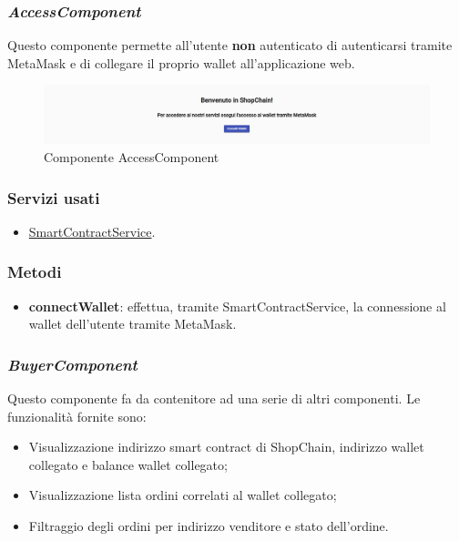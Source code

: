 \subsubsection*{\textit{AccessComponent}}
\label{sec:access-component}
Questo componente permette all'utente \textbf{non} autenticato di autenticarsi tramite MetaMask e di collegare il proprio wallet all'applicazione web.

\begin{figure}[!h] 
    \centering 
    \includegraphics[width=1\columnwidth]{immagini/componenti/access.png} 
    \caption{Componente AccessComponent}
\end{figure}

\subsubsection{Servizi usati}
\begin{itemize}
    \item \hyperref[sec:smart-contract-service]{SmartContractService}.
\end{itemize}

\subsubsection{Metodi}
\begin{itemize}
    \item \textbf{connectWallet}: effettua, tramite SmartContractService, la connessione al wallet dell'utente tramite MetaMask.
\end{itemize}


\subsubsection*{\textit{BuyerComponent}}
\label{sec:buyer-component}
Questo componente fa da contenitore ad una serie di altri componenti. Le funzionalità fornite sono:
\begin{itemize}
    \item Visualizzazione indirizzo smart contract di ShopChain, indirizzo wallet collegato e balance wallet collegato;
    \item Visualizzazione lista ordini correlati al wallet collegato;
    \item Filtraggio degli ordini per indirizzo venditore e stato dell'ordine.
\end{itemize}


